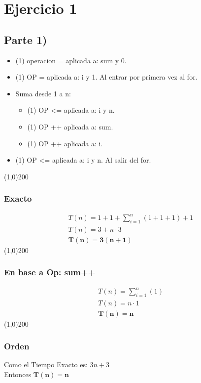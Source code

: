 \section*{Ejercicio 1}
\subsection*{Parte 1)}
\begin{itemize}
  \item (1) operacion = aplicada a: sum y 0.
  \item (1) OP = aplicada a: i y 1. Al entrar por primera vez al for.
  \item Suma desde 1 a n:
  \begin{itemize}
    \item (1) OP <= aplicada a: i y n.
    \item (1) OP ++ aplicada a: sum.
    \item (1) OP ++ aplicada a: i.
  \end{itemize}
\item (1) OP <= aplicada a: i y n. Al salir del for.
\end{itemize}
\line(1,0){200}
\subsubsection*{Exacto}
\begin{align*}
&T(n) = 1+1+\sum_{i=1}^{n}{(1+1+1)} + 1\\
&T(n) = 3 + n \cdot 3\\ 
&\mathbf{T(n) = 3(n+1)}
\end{align*}
\line(1,0){200}
\subsubsection*{En base a Op: sum++}
\begin{align*}
&T(n) = \sum_{i=1}^{n}{(1)}\\
&T(n) = n \cdot 1\\
&\mathbf{T(n) = n}
\end{align*}
\line(1,0){200}
\subsubsection*{Orden}
Como el Tiempo Exacto es: $\displaystyle 3n + 3$\\
Entonces $\mathbf{T(n) = n}$\\
\pagebreak
